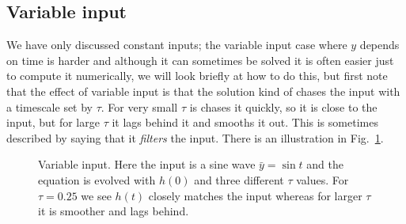 \documentclass{article}
\begin{document}
\subsection*{Variable input}

We have only discussed constant inputs; the variable input case where
$y$ depends on time is harder and although it can sometimes be solved
it is often easier just to compute it numerically, we will look
briefly at how to do this, but first note that the effect of variable
input is that the solution kind of chases the input with a timescale
set by $\tau$. For very small $\tau$ is chases it quickly, so it is
close to the input, but for large $\tau$ it lags behind it and smooths
it out. This is sometimes described by saying that it \textsl{filters}
the input. There is an illustration in Fig.~\ref{chasing}.

\begin{figure}
\begin{center}

\end{center}
\caption{Variable input. Here the input is a sine wave
  $\bar{y}=\sin{t}$ and the equation is evolved with $h(0)$ and three
  different $\tau$ values. For $\tau=0.25$ we see $h(t)$ closely
  matches the input whereas for larger $\tau$ it is smoother and lags
  behind.\label{chasing}}
\end{figure}
\end{document}
